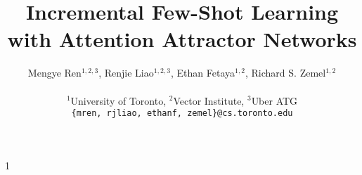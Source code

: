 \documentclass{article}
\newcommand{\ourmodel}{Attention Attractor Networks}
\newcommand{\ourproblem}{Incremental Few-Shot Learning}
\def\arxiv{1}
\begin{document}
\title{{\ourproblem} with {\ourmodel}}
\author{Mengye Ren$^{1,2,3}$, Renjie Liao$^{1,2,3}$, Ethan Fetaya$^{1,2}$, Richard S. Zemel$^{1,2}$\\\\
${}^1$University of Toronto, ${}^2$Vector Institute, ${}^3$Uber ATG\\
\texttt{\{mren, rjliao, ethanf, zemel\}@cs.toronto.edu}}
\maketitle
\vspace{-0.2in}

\vspace{-0.1in}






{


}
\appendix
\if\arxiv1

\fi
\end{document}
